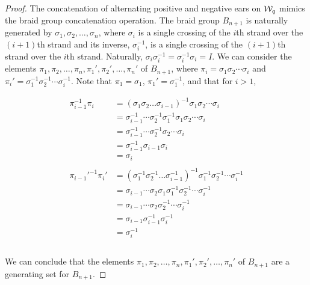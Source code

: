 \documentclass[paper.tex]{subfiles}
\begin{document}
\begin{proof}

    The concatenation of alternating positive and negative ears on $\mathcal{W}_q$ mimics the braid group concatenation operation. The braid group $B_{n+1}$ is naturally generated by $\sigma_1, \sigma_2, \dots, \sigma_{n}$, where $\sigma_i$ is a single crossing of the $i$th strand over the $(i + 1)$th strand and its inverse, $\sigma_i^{-1}$, is a single crossing of the $(i + 1)$th strand over the $i$th strand. Naturally, $\sigma_i \sigma_i^{-1} = \sigma_i^{-1} \sigma_i = I$. We can consider the elements $\pi_1, \pi_2, \dots, \pi_n, \pi_1', \pi_2', \dots, \pi_n'$ of $B_{n+1}$, where $\pi_i = \sigma_1 \sigma_2 \cdots \sigma_i$ and $\pi_i' = \sigma_1^{-1} \sigma_2^{-1} \cdots \sigma_i^{-1}$. Note that $\pi_1 = \sigma_1$, $\pi_1' = \sigma_1^{-1}$, and that for $i > 1$, 
    
    \begin{align*}
        \pi_{i-1}^{-1} \pi_i  &= (\sigma_1 \sigma_2 \dots \sigma_{i - 1})^{-1} \sigma_1 \sigma_2 \cdots \sigma_i \\ 
                              &= \sigma_{i - 1}^{-1} \cdots \sigma_2^{-1} \sigma_1^{-1} \sigma_1 \sigma_2 \cdots \sigma_i \\
                              &= \sigma_{i - 1}^{-1} \cdots \sigma_2^{-1} \sigma_2 \cdots \sigma_i \\
                              &= \sigma_{i - 1}^{-1} \sigma_{i - 1} \sigma_i  \\
                              &= \sigma_i \\ \\
        \pi_{i-1}'^{-1} \pi_i'  &= (\sigma_1^{-1} \sigma_2^{-1} \dots \sigma_{i - 1}^{-1})^{-1} \sigma_1^{-1} \sigma_2^{-1} \cdots \sigma_i^{-1} \\ 
                                &= \sigma_{i - 1} \cdots \sigma_2 \sigma_1 \sigma_1^{-1} \sigma_2^{-1} \cdots \sigma_i^{-1} \\
                                &= \sigma_{i - 1} \cdots \sigma_2 \sigma_2^{-1} \cdots \sigma_i^{-1} \\
                                &= \sigma_{i - 1} \sigma_{i - 1}^{-1} \sigma_i^{-1}  \\
                                &= \sigma_i^{-1} \\ \\
    \end{align*}

    We can conclude that the elements $\pi_1, \pi_2, \dots, \pi_n, \pi_1', \pi_2', \dots, \pi_n'$ of $B_{n+1}$ are a generating set for $B_{n+1}$. 


\end{proof}
\end{document}
